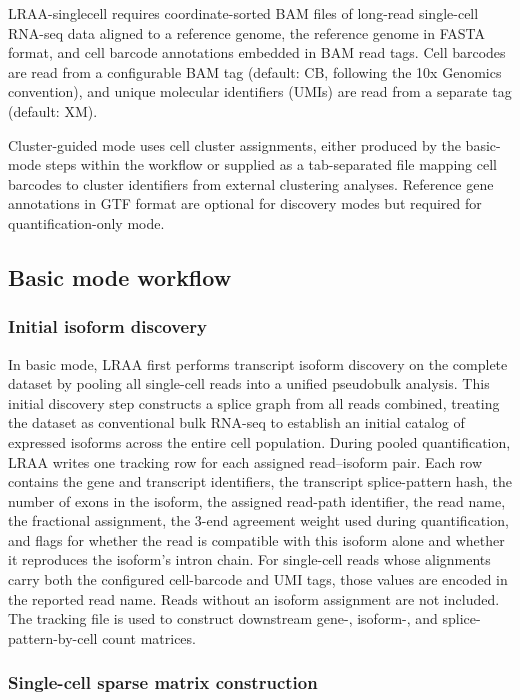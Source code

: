 LRAA-singlecell requires coordinate-sorted BAM files of long-read single-cell RNA-seq data aligned to a reference genome, the reference genome in FASTA format, and cell barcode annotations embedded in BAM read tags. Cell barcodes are read from a configurable BAM tag (default: CB, following the 10x Genomics convention), and unique molecular identifiers (UMIs) are read from a separate tag (default: XM).

Cluster-guided mode uses cell cluster assignments, either produced by the basic-mode steps within the workflow or supplied as a tab-separated file mapping cell barcodes to cluster identifiers from external clustering analyses. Reference gene annotations in GTF format are optional for discovery modes but required for quantification-only mode.

\subsection{Basic mode workflow}\label{basic-mode-workflow}

\subsubsection{Initial isoform discovery}\label{initial-isoform-discovery}

In basic mode, LRAA first performs transcript isoform discovery on the complete dataset by pooling all single-cell reads into a unified pseudobulk analysis. This initial discovery step constructs a splice graph from all reads combined, treating the dataset as conventional bulk RNA-seq to establish an initial catalog of expressed isoforms across the entire cell population. During pooled quantification, LRAA writes one tracking row for each assigned read--isoform pair. Each row contains the gene and transcript identifiers, the transcript splice-pattern hash, the number of exons in the isoform, the assigned read-path identifier, the read name, the fractional assignment, the 3\p{}-end agreement weight used during quantification, and flags for whether the read is compatible with this isoform alone and whether it reproduces the isoform's intron chain. For single-cell reads whose alignments carry both the configured cell-barcode and UMI tags, those values are encoded in the reported read name. Reads without an isoform assignment are not included. The tracking file is used to construct downstream gene-, isoform-, and splice-pattern-by-cell count matrices.

\subsubsection{Single-cell sparse matrix construction}\label{single-cell-sparse-matrix-construction}

